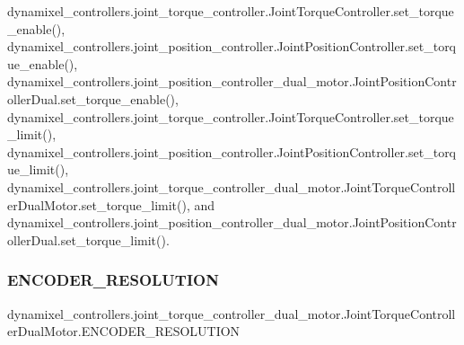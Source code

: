 dynamixel\+\_\+controllers.\+joint\+\_\+torque\+\_\+controller.\+Joint\+Torque\+Controller.\+set\+\_\+torque\+\_\+enable(), dynamixel\+\_\+controllers.\+joint\+\_\+position\+\_\+controller.\+Joint\+Position\+Controller.\+set\+\_\+torque\+\_\+enable(), dynamixel\+\_\+controllers.\+joint\+\_\+position\+\_\+controller\+\_\+dual\+\_\+motor.\+Joint\+Position\+Controller\+Dual.\+set\+\_\+torque\+\_\+enable(), dynamixel\+\_\+controllers.\+joint\+\_\+torque\+\_\+controller.\+Joint\+Torque\+Controller.\+set\+\_\+torque\+\_\+limit(), dynamixel\+\_\+controllers.\+joint\+\_\+position\+\_\+controller.\+Joint\+Position\+Controller.\+set\+\_\+torque\+\_\+limit(), dynamixel\+\_\+controllers.\+joint\+\_\+torque\+\_\+controller\+\_\+dual\+\_\+motor.\+Joint\+Torque\+Controller\+Dual\+Motor.\+set\+\_\+torque\+\_\+limit(), and dynamixel\+\_\+controllers.\+joint\+\_\+position\+\_\+controller\+\_\+dual\+\_\+motor.\+Joint\+Position\+Controller\+Dual.\+set\+\_\+torque\+\_\+limit().

\mbox{\label{classdynamixel__controllers_1_1joint__torque__controller__dual__motor_1_1_joint_torque_controller_dual_motor_a8bd7f5ce441f4b38400f2eff2f5e6996}} 
\subsubsection{\texorpdfstring{E\+N\+C\+O\+D\+E\+R\+\_\+\+R\+E\+S\+O\+L\+U\+T\+I\+ON}{ENCODER\_RESOLUTION}}
{\footnotesize\ttfamily dynamixel\+\_\+controllers.\+joint\+\_\+torque\+\_\+controller\+\_\+dual\+\_\+motor.\+Joint\+Torque\+Controller\+Dual\+Motor.\+E\+N\+C\+O\+D\+E\+R\+\_\+\+R\+E\+S\+O\+L\+U\+T\+I\+ON}



